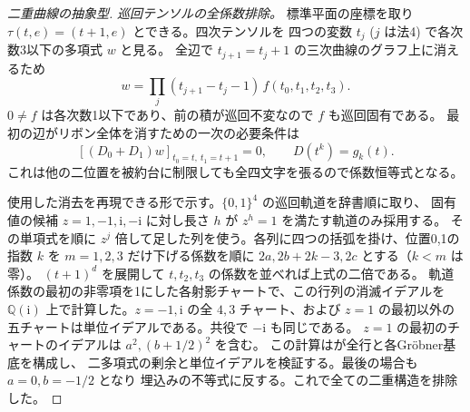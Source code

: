 \begin{proof}[二重曲線の抽象型]
\smallskip
\noindent\textit{巡回テンソルの全係数排除。}
標準平面の座標を取り $\tau(t,e)=(t+1,e)$ とできる。四次テンソルを
四つの変数 $t_j$ ($j$ は法4) で各次数3以下の多項式 $w$ と見る。
全辺で $t_{j+1}=t_j+1$ の三次曲線のグラフ上に消えるため
\[
                  w=\prod_j(t_{j+1}-t_j-1)\, f(t_0,t_1,t_2,t_3).
\]
$0\ne f$ は各次数1以下であり、前の積が巡回不変なので $f$ も巡回固有である。
最初の辺がリボン全体を消すための一次の必要条件は
\[
       [(D_0+D_1)w]_{t_0=t,\ t_1=t+1}=0,\qquad D(t^k)=g_k(t).
\]
これは他の二位置を被約台に制限しても全四文字を張るので係数恒等式となる。

使用した消去を再現できる形で示す。$\{0,1\}^4$ の巡回軌道を辞書順に取り、
固有値の候補 $z=1,-1,\mathrm i,-\mathrm i$ に対し長さ $h$ が $z^h=1$ を満たす軌道のみ採用する。
その単項式を順に $z^j$ 倍して足した列を使う。各列に四つの括弧を掛け、位置0,1の指数
$k$ を $m=1,2,3$ だけ下げる係数を順に $2a,2b+2k-3,2c$ とする（$k<m$ は零）。
$(t+1)^d$ を展開して $t,t_2,t_3$ の係数を並べれば上式の二倍である。
軌道係数の最初の非零項を1にした各射影チャートで、この行列の消滅イデアルを
$\mathbb Q(\mathrm i)$ 上で計算した。$z=-1,\mathrm i$ の全 $4,3$ チャート、および
$z=1$ の最初以外の五チャートは単位イデアルである。共役で $-\mathrm i$ も同じである。
$z=1$ の最初のチャートのイデアルは $a^2,(b+1/2)^2$ を含む。
この計算はが全行と各Gröbner基底を構成し、
二多項式の剰余と単位イデアルを検証する。最後の場合も $a=0,b=-1/2$ となり
埋込みの不等式に反する。これで全ての二重構造を排除した。
\end{proof}
